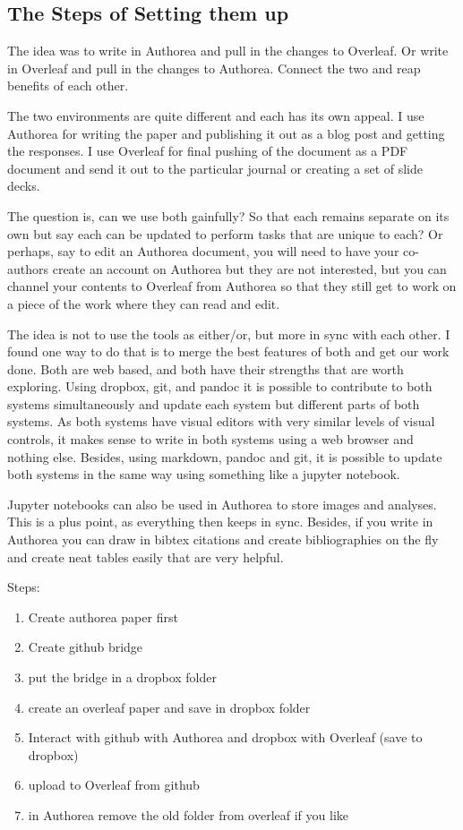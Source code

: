\subsection{The Steps of Setting them up}

The idea was to write in Authorea and pull in the changes to Overleaf.
Or write in Overleaf and pull in the changes to Authorea. 
Connect the two and reap benefits of each other. 

The two environments are quite different and each has its own appeal. I use Authorea for writing the paper and publishing it out as a blog post and getting the responses. I use Overleaf for final pushing of the document as a PDF document and send it out to the particular journal or creating a set of slide decks. 

The question is, can we use both gainfully? So that each remains separate on its own but say each can be updated to perform tasks that are unique to each? Or perhaps, say to edit an Authorea document, you will need to have your co-authors create an account on Authorea but they are not interested, but you can channel your contents to Overleaf from Authorea so that they still get to work on a piece of the work where they can read and edit. 

The idea is not to use the tools as either/or, but more in sync with each other. I found one way to do that is to merge the best features of both and get our work done. Both are web based, and both have their strengths that are worth exploring. Using dropbox, git, and pandoc it is possible to contribute to both systems simultaneously and update each system but different parts of both systems. As both systems have visual editors with very similar levels of visual controls, it makes sense to write in both systems using a web browser and nothing else. Besides, using markdown, pandoc and git, it is possible to update both systems in the same way using something like a jupyter notebook. 

Jupyter notebooks can also be used in Authorea to store images and analyses. This is a plus point, as everything then keeps in sync. Besides, if you write in Authorea you can draw in bibtex citations and create bibliographies on the fly and create neat tables easily that are very helpful. 

Steps:
\begin{enumerate}
\item Create authorea paper first
\item Create github bridge
\item put the bridge in a dropbox folder
\item create an overleaf paper and save in dropbox folder
\item Interact with github with Authorea and dropbox with Overleaf (save to dropbox)
\item upload to Overleaf from github
\item in Authorea remove the old folder from overleaf if you like
\end{enumerate}


